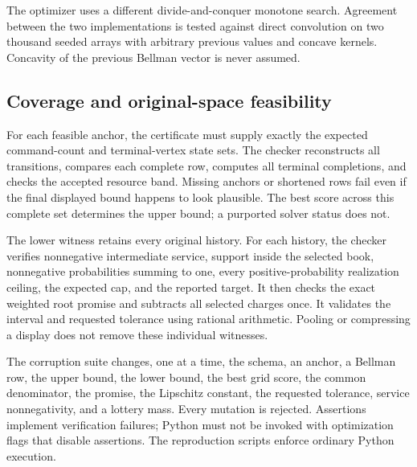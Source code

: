 The optimizer uses a different divide-and-conquer monotone search. Agreement between the two implementations is tested against direct convolution on two thousand seeded arrays with arbitrary previous values and concave kernels. Concavity of the previous Bellman vector is never assumed.

\subsection{Coverage and original-space feasibility}
For each feasible anchor, the certificate must supply exactly the expected command-count and terminal-vertex state sets. The checker reconstructs all transitions, compares each complete row, computes all terminal completions, and checks the accepted resource band. Missing anchors or shortened rows fail even if the final displayed bound happens to look plausible. The best score across this complete set determines the upper bound; a purported solver status does not.

The lower witness retains every original history. For each history, the checker verifies nonnegative intermediate service, support inside the selected book, nonnegative probabilities summing to one, every positive-probability realization ceiling, the expected cap, and the reported target. It then checks the exact weighted root promise and subtracts all selected charges once. It validates the interval and requested tolerance using rational arithmetic. Pooling or compressing a display does not remove these individual witnesses.

The corruption suite changes, one at a time, the schema, an anchor, a Bellman row, the upper bound, the lower bound, the best grid score, the common denominator, the promise, the Lipschitz constant, the requested tolerance, service nonnegativity, and a lottery mass. Every mutation is rejected. Assertions implement verification failures; Python must not be invoked with optimization flags that disable assertions. The reproduction scripts enforce ordinary Python execution.

